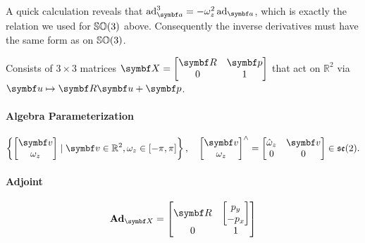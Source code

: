 A quick calculation reveals that $\ad_\a^3 = -\omega_z^2 \ad_\a$, which is exactly the relation we used for ${\mathbb{SO}(3)}$ above. Consequently the inverse derivatives must have the same form as on ${\mathbb{SO}(3)}$.

\begin{properties}[breakable, title={$\SEtwo$ formula sheet}]
  Consists of $3 \times 3$ matrices $\X = \begin{bmatrix} \bR & \bp \\ 0 & 1 \end{bmatrix}$ that act on $\mathbb{R}^{2}$ via $\bu \mapsto \bR \bu + \bp$.

  \paragraph{Algebra Parameterization}
  \begin{equation}
    \left\{\begin{bmatrix} \bv \\ \omega_{z} \end{bmatrix} \mid \bv \in \mathbb{R}^{2},  \omega_{z} \in [-\pi, \pi] \right\}, \quad \begin{bmatrix} \bv \\ \omega_{z} \end{bmatrix}^{\wedge} =
    \begin{bmatrix}
      \hat \omega_{z} & \bv \\ 0 & 0
    \end{bmatrix} \in \setwo.
  \end{equation}

  \paragraph{Adjoint}
  \begin{equation}
    \bAd_{\X} = \begin{bmatrix}
      \bR & \begin{bmatrix} p_{y} \\ -p_{x} \end{bmatrix}
      \\ 0 & 1
    \end{bmatrix}
  \end{equation}


\end{properties}
